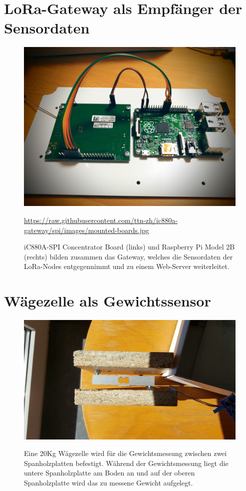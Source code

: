 \section{LoRa-Gateway als Empfänger der Sensordaten}
\begin{figure}[H]
    \center
    \includegraphics[width=15cm]{Bilder/mounted-boards.jpg}\\
    \caption{iC880A-SPI Concentrator Board (links) und Raspberry Pi Model 2B (rechts) bilden zusammen das Gateway, welches die Sensordaten der LoRa-Nodes entgegennimmt und zu einem Web-Server weiterleitet.}
    \begin{flushleft}
        \quelle\url{https://raw.githubusercontent.com/ttn-zh/ic880a-gateway/spi/images/mounted-boards.jpg}
    \end{flushleft}
    \label{fig:UeberblickDerBauteile}
\end{figure}
\newpage
\section{Wägezelle als Gewichtssensor}
\begin{figure}[H]
    \center
    \includegraphics[width=15cm]{Bilder/waegezelle.jpg}\\
    \caption{Eine 20Kg Wägezelle wird für die Gewichtsmessung zwischen zwei Spanholzplatten befestigt. Während der Gewichtsmessung liegt die untere Spanholzplatte am Boden an und auf der oberen Spanholzplatte wird das zu messene Gewicht aufgelegt.}
    \label{fig:Waegezelle}
\end{figure}
\newpage
